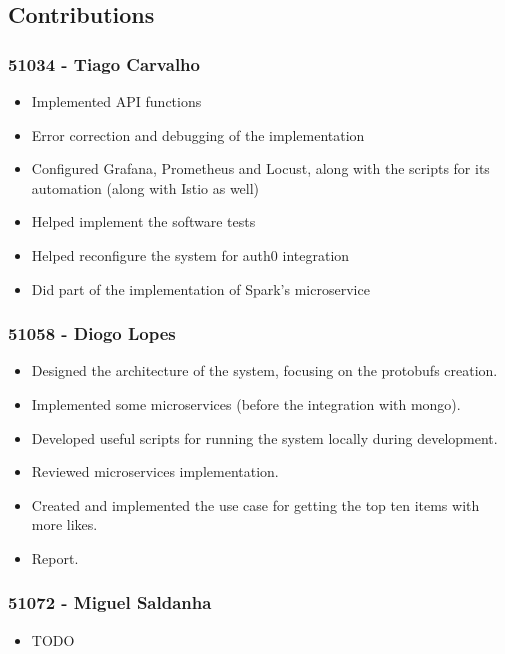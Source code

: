 \documentclass[oneside]{article}
\begin{document}
  \subsection{Contributions}
  \label{sec:contributions}

    \subsubsection{51034 - Tiago Carvalho}
    	\begin{itemize}
    		\item Implemented API functions
    		\item Error correction and debugging of the implementation
    		\item Configured Grafana, Prometheus and Locust, along with the scripts for its automation (along with Istio as well)
    		\item Helped implement the software tests
    		\item Helped reconfigure the system for auth0 integration
    		\item Did part of the implementation of Spark's microservice
    	\end{itemize}
    \subsubsection{51058 - Diogo Lopes}
      \begin{itemize}
        \item Designed the architecture of the system, focusing on the protobufs creation.
        \item Implemented some microservices (before the integration with mongo).
        \item Developed useful scripts for running the system locally during development.
        \item Reviewed microservices implementation.
        \item Created and implemented the use case for getting the top ten items with more likes.
        \item Report.
      \end{itemize}
    \subsubsection{51072 - Miguel Saldanha}
      \begin{itemize}
        \item TODO
      \end{itemize}
\end{document}
